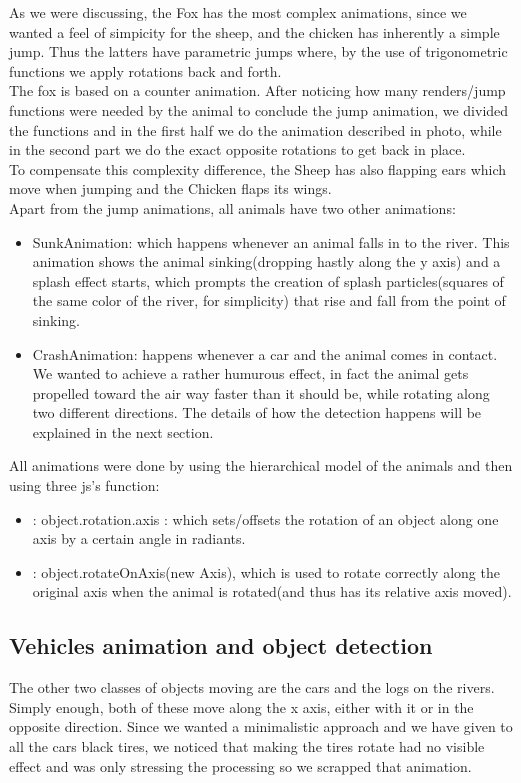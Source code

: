 \documentclass[a4paper, 11pt]{article}
\begin{document}
As we were discussing, the Fox has the most complex animations, since we wanted a feel of simpicity for the sheep, and the chicken has inherently a simple jump. Thus the latters have parametric jumps where, by the use of trigonometric functions we apply rotations back and forth.\\
The fox is based on a counter animation. After noticing how many renders/jump functions were needed by the animal to conclude the jump animation, we divided the functions and in the first half we do the animation described in photo, while in the second part we do the exact opposite rotations to get back in place.\\
To compensate this complexity difference, the Sheep has also flapping ears which move when jumping and the Chicken flaps its wings.\\
Apart from the jump animations, all animals have two other animations:
\begin{itemize}
\item SunkAnimation: which happens whenever an animal falls in to the river. This animation shows the animal sinking(dropping hastly along the y axis) and a splash effect starts, which prompts the creation of splash particles(squares of the same color of the river, for simplicity) that rise and fall from the point of sinking.
\item CrashAnimation: happens whenever a car and the animal comes in contact. We wanted to achieve a rather humurous effect, in fact the animal gets propelled toward the air way faster than it should be, while rotating along two different directions. The details of how the detection happens will be explained in the next section.
\end{itemize}
All animations were done by using the hierarchical model of the animals and then using three js's function:
\begin{itemize}
\item : object.rotation.axis : which sets/offsets the rotation of an object along one axis  by a certain angle in radiants.
\item: object.rotateOnAxis(new Axis), which is used to rotate correctly along the original axis when the animal is rotated(and thus has its relative axis moved).
\end{itemize}
\subsection{Vehicles animation and object detection}
The other two classes of objects moving are the cars and the logs on the rivers.\\
Simply enough, both of these move along the x axis, either with it or in the opposite direction. Since we wanted a minimalistic approach and we have given to all the cars black tires, we noticed that making the tires rotate had no visible effect and was only stressing the  processing so we scrapped that animation.\\
\end{document}
